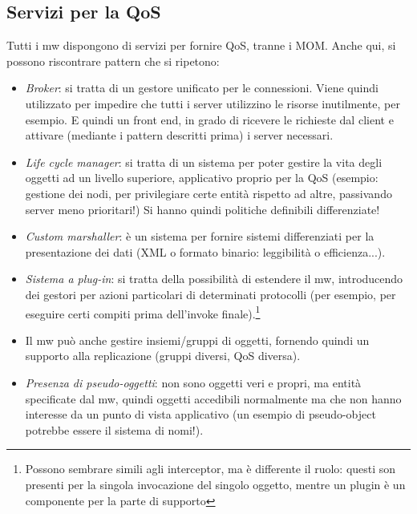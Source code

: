 \subsection{Servizi per la QoS}
Tutti i mw dispongono di servizi per fornire QoS, tranne i MOM. Anche qui, si possono riscontrare pattern che si
ripetono:
\begin{itemize}
 \item \textit{Broker}: si tratta di un gestore unificato per le connessioni. Viene quindi utilizzato per impedire 
 che tutti i server utilizzino le risorse inutilmente, per esempio. E quindi un front end, in grado di ricevere le
 richieste dal client e attivare (mediante i pattern descritti prima) i server necessari.
 \item \textit{Life cycle manager}: si tratta di un sistema per poter gestire la vita degli oggetti ad un livello
 superiore, applicativo proprio per la QoS (esempio: gestione dei nodi, per privilegiare certe entità rispetto ad
 altre, passivando server meno prioritari!) Si hanno quindi politiche definibili differenziate!
 \item \textit{Custom marshaller}: è un sistema per fornire sistemi differenziati per la presentazione dei dati (XML 
 o formato binario: leggibilità o efficienza...).
 \item \textit{Sistema a plug-in}: si tratta della possibilità di estendere il mw, introducendo dei gestori per azioni
 particolari di determinati protocolli (per esempio, per eseguire certi compiti prima dell'invoke
 finale).\footnote{Possono sembrare simili agli interceptor, ma è differente il ruolo: questi son presenti per la
 singola invocazione del singolo oggetto, mentre un plugin è un componente per la parte di supporto}
 \item Il mw può anche gestire insiemi/gruppi di oggetti, fornendo quindi un supporto alla replicazione (gruppi 
 diversi, QoS diversa).
 \item \textit{Presenza di pseudo-oggetti}: non sono oggetti veri e propri, ma entità specificate dal mw, quindi
 oggetti accedibili normalmente ma che non hanno interesse da un punto di vista applicativo (un esempio di 
 pseudo-object potrebbe essere il sistema di nomi!).
\end{itemize}